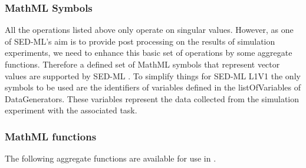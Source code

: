 \subsubsection{MathML Symbols}
All the operations listed above only operate on singular values. However, as one of SED-ML's aim is to provide post processing on the results of simulation experiments, we need to enhance this basic set of operations by some aggregate functions. 
Therefore a defined set of MathML symbols that represent vector values are supported by SED-ML \LoneVone. 
To simplify things for SED-ML L1V1 the only symbols to be used are the identifiers of variables defined in the listOfVariables of DataGenerators. These variables represent the data collected from the simulation experiment with the associated task. 

\subsubsection{MathML functions}
The following aggregate functions are available for use in \LoneVone.

